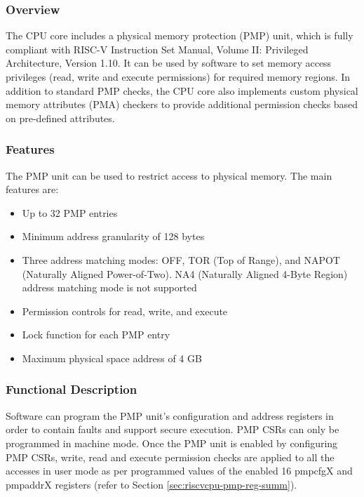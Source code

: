 \documentclass[main\_\_EN.tex]{subfiles}
\begin{document}
\subsubsection{Overview}
\label{sec:riscvcpu-pmp-overview}
The CPU core includes a physical memory protection (PMP) unit, which is fully compliant with RISC-V Instruction Set Manual, Volume II: Privileged Architecture, Version 1.10. It can be used by software to set memory access privileges (read, write and execute permissions) for required memory regions. In addition to standard PMP checks, the CPU core also implements custom physical memory attributes (PMA) checkers to provide additional permission checks based on pre-defined attributes.

\subsubsection{Features}
\label{sec:riscvcpu-pmp-features}

The PMP unit can be used to restrict access to physical memory. The main features are:

\begin{itemize}
    \item Up to 32 PMP entries
    \item Minimum address granularity of 128 bytes
    \item Three address matching modes: OFF, TOR (Top of Range), and NAPOT (Naturally Aligned Power-of-Two). NA4 (Naturally Aligned 4-Byte Region) address matching mode is not supported
    \item Permission controls for read, write, and execute
    \item Lock function for each PMP entry
    \item Maximum physical space address of 4 GB
\end{itemize}

\subsubsection{Functional Description}
\label{sec:riscvcpu-pmp-func-descr}

Software can program the PMP unit's configuration and address registers in order to contain faults and support secure execution. PMP CSRs can only be programmed in machine mode. Once the PMP unit is enabled by configuring PMP CSRs, write, read and execute permission checks are applied to all the accesses in user mode as per programmed values of the enabled 16 pmpcfgX and pmpaddrX registers (refer to Section \ref{sec:riscvcpu-pmp-reg-summ}).
\end{document}
